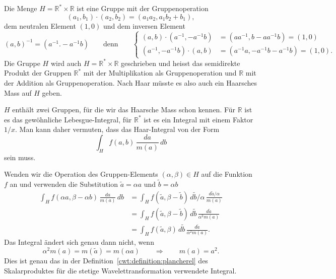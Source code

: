 Die Menge $H=\mathbb R^*\times \mathbb R$ ist eine Gruppe mit der
Gruppenoperation
\[
(a_1,b_1)\cdot (a_2,b_2) = (a_1a_2,a_1b_2+b_1),
\]
dem neutralen Element $(1,0)$ und dem inversen Element
\[
(a,b)^{-1} = (a^{-1}.-a^{-1}b)
\qquad\text{denn}\qquad
\left\{
\begin{aligned}
(a,b)\cdot (a^{-1},-a^{-1}b)
&=
(aa^{-1},b-aa^{-1}b)=(1,0)
\\
(a^{-1},-a^{-1}b)\cdot (a,b)
&=
(a^{-1}a,-a^{-1}b-a^{-1}b)=(1,0).
\end{aligned}
\right.
\]
Die Gruppe $H$ wird auch $H=\mathbb R^*\times \mathbb R$ geschrieben
und heisst das semidirekte Produkt der Gruppen $\mathbb R^*$ mit der
Multiplikation als Gruppenoperation und $\mathbb R$ mit der Addition
als Gruppenoperation.
Nach Haar müsste es also auch ein Haarsches Mass auf $H$ geben.

$H$ enthält zwei Gruppen, für die wir das Haarsche Mass schon kennen.
Für $\mathbb R$ ist es das gewöhnliche Lebesgue-Integral, für $\mathbb R^*$
ist es ein Integral mit einem Faktor $1/x$.
Man kann daher vermuten, dass das Haar-Integral von der Form
\[
\int_H f(a,b) \,\frac{da}{m(a)}\,db
\]
sein muss.

Wenden wir die Operation des Gruppen-Elements $(\alpha,\beta)\in H$
auf die Funktion $f$ an und verwenden die Substitution
$\tilde{a}=\alpha a$ und $\tilde{b}=\alpha b$
\begin{align*}
\int_H f(\alpha a,\beta-\alpha b) \,\frac{da}{m(a)}\,db
&=
\int_H f(\tilde{a}, \beta - \tilde b) \,
d\tilde{b}/\alpha\,\frac{d\tilde{a}/\alpha}{m(a)}
\\
&=
\int_H f(\tilde{a}, \beta - \tilde b) \,
d\tilde{b}\,\frac{d\tilde{a}}{\alpha^2m(a)}
\\
&=
\int_H f(\tilde{a}, \beta) \,
d\tilde{b}\,\frac{d\tilde{a}}{\alpha^2m(a)}.
\end{align*}
Das Integral ändert sich genau dann nicht, wenn
\[
\alpha^2 m(a)
=
m(\tilde{a})
=
m(\alpha a)
\qquad\Rightarrow\qquad
m(a) = a^2.
\]
Dies ist genau das in der Definition~\ref{cwt:definition:plancherel}
des Skalarproduktes für die stetige Wavelettransformation verwendete
Integral.





